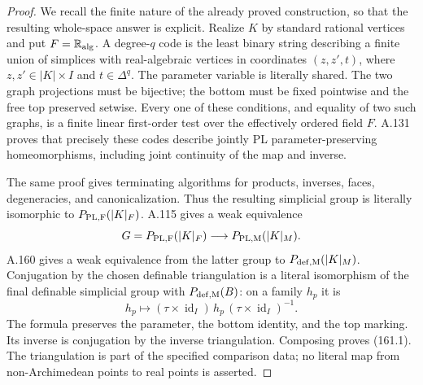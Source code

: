 \begin{proof}
We recall the finite nature of the already proved construction,
so that the resulting whole-space answer is explicit. Realize \(K\)
by standard rational vertices and put \(F=\mathbb R_{\rm alg}\).
A degree-\(q\) code is the least binary string describing a finite
union of simplices with real-algebraic vertices in coordinates
\((z,z',t)\), where \(z,z'\in |K|\times I\) and
\(t\in\Delta^q\). The parameter variable is literally shared.
The two graph projections must be bijective; the bottom must be fixed
pointwise and the free top preserved setwise. Every one of these
conditions, and equality of two such graphs, is a finite linear
first-order test over the effectively ordered field \(F\).
A.131 proves that precisely these codes describe jointly PL
parameter-preserving homeomorphisms, including joint continuity of
the map and inverse.

The same proof gives terminating algorithms for products, inverses,
faces, degeneracies, and canonicalization. Thus the resulting
simplicial group is literally isomorphic to
\(P_{\rm PL,F}(|K|_F)\). A.115 gives a weak equivalence
\[
 G=P_{\rm PL,F}(|K|_F)
 \longrightarrow P_{\rm PL,M}(|K|_M).
\]
A.160 gives a weak equivalence from the latter group to
\(P_{\rm def,M}(|K|_M)\). Conjugation by the chosen definable
triangulation is a literal isomorphism of the final definable
simplicial group with \(P_{\rm def,M}(B)\): on a family \(h_p\) it is
\[
 h_p\longmapsto
 (\tau\times\operatorname{id}_I)\,h_p\,
 (\tau\times\operatorname{id}_I)^{-1}.
\]
The formula preserves the parameter, the bottom identity, and the
top marking. Its inverse is conjugation by the inverse triangulation.
Composing proves (161.1). The triangulation is part of the specified
comparison data; no literal map from non-Archimedean points to real
points is asserted.


\end{proof}
